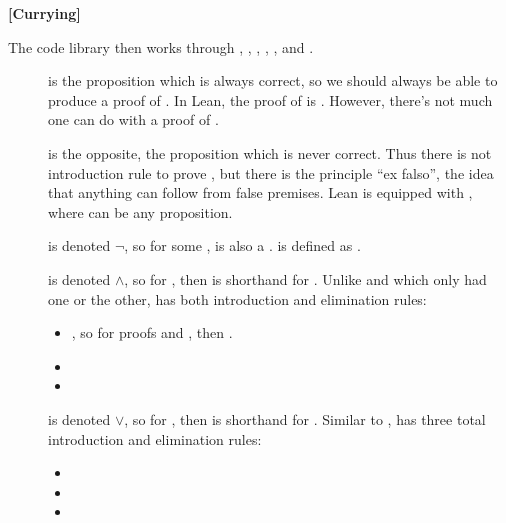 \textbf{[Currying]}

The code library then works through , , , 
, , and .
\begin{description}
    \item[] is the proposition which is always correct, 
    so we should always be able to produce a proof of . In Lean,
    the proof of  is . However, there's 
    not much one can do with a proof of .
    \item[] is the opposite, the proposition which is 
    never correct. Thus there is not introduction rule to prove , 
    but there is the principle ``ex falso'', the idea that anything can 
    follow from false premises. Lean is equipped with ,
    where  can be any proposition. 
    \item[] is denoted $\lnot$, so for
    some ,  is also a . 
     is defined as .
    \item[] is denoted $\wedge$, so 
    for , then  is shorthand for 
    . Unlike  and  which only 
    had one or the other,  has both introduction and elimination
    rules: \begin{itemize}
        \item {}, so for
        proofs  and , then 
        .
        \item {}
        \item {} 
    \end{itemize}
    \item[] is denoted $\vee$, so 
    for , then  is shorthand for 
    . Similar to ,  has three total 
    introduction and elimination rules: \begin{itemize}
        \item {}
        \item {}
        \item {} 

\end{itemize}
\end{description}
